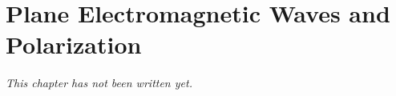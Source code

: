 \chapter{Plane Electromagnetic Waves and Polarization}\label{ch:b2:plane-waves-polarization}


\emph{This chapter has not been written yet.}
